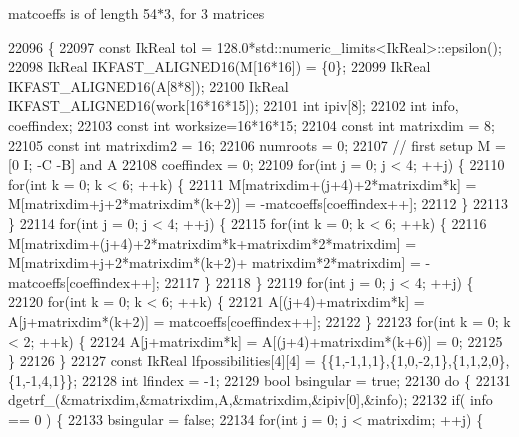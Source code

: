 matcoeffs is of length 54$\ast$3, for 3 matrices 
\begin{DoxyCode}
22096 \{
22097     \textcolor{keyword}{const} IkReal tol = 128.0*std::numeric\_limits<IkReal>::epsilon();
22098     IkReal IKFAST\_ALIGNED16(M[16*16]) = \{0\};
22099     IkReal IKFAST\_ALIGNED16(A[8*8]);
22100     IkReal IKFAST\_ALIGNED16(work[16*16*15]);
22101     \textcolor{keywordtype}{int} ipiv[8];
22102     \textcolor{keywordtype}{int} info, coeffindex;
22103     \textcolor{keyword}{const} \textcolor{keywordtype}{int} worksize=16*16*15;
22104     \textcolor{keyword}{const} \textcolor{keywordtype}{int} matrixdim = 8;
22105     \textcolor{keyword}{const} \textcolor{keywordtype}{int} matrixdim2 = 16;
22106     numroots = 0;
22107     \textcolor{comment}{// first setup M = [0 I; -C -B] and A}
22108     coeffindex = 0;
22109     \textcolor{keywordflow}{for}(\textcolor{keywordtype}{int} j = 0; j < 4; ++j) \{
22110         \textcolor{keywordflow}{for}(\textcolor{keywordtype}{int} k = 0; k < 6; ++k) \{
22111             M[matrixdim+(j+4)+2*matrixdim*k] = M[matrixdim+j+2*matrixdim*(k+2)] = -matcoeffs[coeffindex++];
22112         \}
22113     \}
22114     \textcolor{keywordflow}{for}(\textcolor{keywordtype}{int} j = 0; j < 4; ++j) \{
22115         \textcolor{keywordflow}{for}(\textcolor{keywordtype}{int} k = 0; k < 6; ++k) \{
22116             M[matrixdim+(j+4)+2*matrixdim*k+matrixdim*2*matrixdim] = M[matrixdim+j+2*matrixdim*(k+2)+
      matrixdim*2*matrixdim] = -matcoeffs[coeffindex++];
22117         \}
22118     \}
22119     \textcolor{keywordflow}{for}(\textcolor{keywordtype}{int} j = 0; j < 4; ++j) \{
22120         \textcolor{keywordflow}{for}(\textcolor{keywordtype}{int} k = 0; k < 6; ++k) \{
22121             A[(j+4)+matrixdim*k] = A[j+matrixdim*(k+2)] = matcoeffs[coeffindex++];
22122         \}
22123         \textcolor{keywordflow}{for}(\textcolor{keywordtype}{int} k = 0; k < 2; ++k) \{
22124             A[j+matrixdim*k] = A[(j+4)+matrixdim*(k+6)] = 0;
22125         \}
22126     \}
22127     \textcolor{keyword}{const} IkReal lfpossibilities[4][4] = \{\{1,-1,1,1\},\{1,0,-2,1\},\{1,1,2,0\},\{1,-1,4,1\}\};
22128     \textcolor{keywordtype}{int} lfindex = -1;
22129     \textcolor{keywordtype}{bool} bsingular = \textcolor{keyword}{true};
22130     \textcolor{keywordflow}{do} \{
22131         dgetrf\_(&matrixdim,&matrixdim,A,&matrixdim,&ipiv[0],&info);
22132         \textcolor{keywordflow}{if}( info == 0 ) \{
22133             bsingular = \textcolor{keyword}{false};
22134             \textcolor{keywordflow}{for}(\textcolor{keywordtype}{int} j = 0; j < matrixdim; ++j) \{

\end{DoxyCode}
